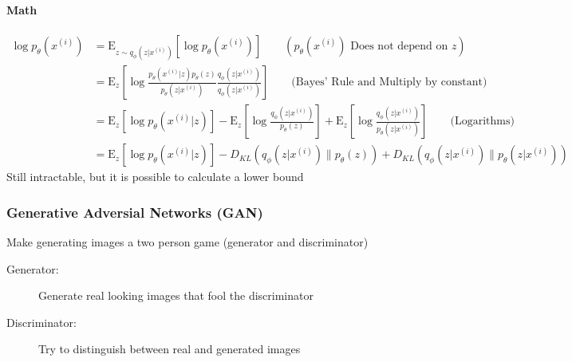 \paragraph{Math}
\begin{align*}
    \log p_\theta(x^{(i)}) & = \mathrm{E}_{z \sim q_\phi(z|x^{(i)})}\left[ \log p_\theta(x^{(i)})\right] \qquad (p_\theta(x^{(i)}) \text{ Does not depend on }z )                                                                                                           \\
                           & = \mathrm{E}_{z}\left[ \log \frac{p_\theta(x^{(i)}|z) p_\theta(z)}{p_\theta(z | x^{(i)})} \frac{q_\phi(z|x^{(i)})}{q_\phi(z|x^{(i)})}\right]\qquad \text{(Bayes' Rule and Multiply by constant)}                                               \\
                           & = \mathrm{E}_{z}\left[ \log p_\theta(x^{(i)}|z)\right] - \mathrm{E}_{z}\left[ \log \frac{q_\phi(z|x^{(i)})}{p_\theta(z)} \right] + \mathrm{E}_{z}\left[ \log \frac{q_\phi(z|x^{(i)})}{p_\theta(z| x^{(i)})} \right] \qquad \text{(Logarithms)} \\
                           & = \mathrm{E}_{z}\left[ \log p_\theta(x^{(i)}|z)\right] - D_{KL} \left(q_\phi(z|x^{(i)})\lVert p_\theta(z) \right) + D_{KL}\left(q_\phi(z|x^{(i)})\lVert p_\theta(z| x^{(i)}) \right)
\end{align*}
Still intractable, but it is possible to calculate a lower bound

\subsubsection{Generative Adversial Networks (GAN)}
Make generating images a two person game (generator and discriminator)
\begin{description}
    \item[Generator:] Generate real looking images that fool the discriminator
    \item[Discriminator:] Try to distinguish between real and generated images
\end{description}

